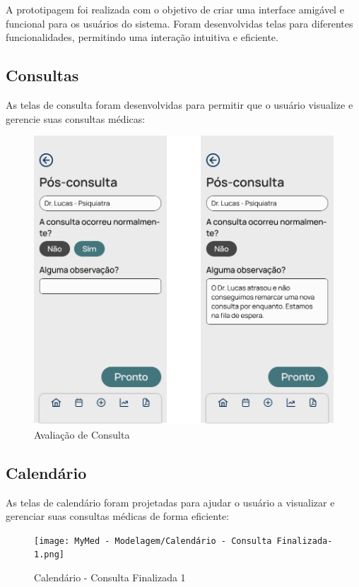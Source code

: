 \pagebreak

A prototipagem foi realizada com o objetivo de criar uma interface amigável e funcional para os usuários do sistema. Foram desenvolvidas telas para diferentes funcionalidades, permitindo uma interação intuitiva e eficiente.

\subsection{Consultas}

As telas de consulta foram desenvolvidas para permitir que o usuário visualize e gerencie suas consultas médicas:

\begin{figure}[!htbp]
	\centering
	\includegraphics[width=1.0\linewidth]{MyMed - Modelagem/Avaliação Consulta.png}
	\caption{Avaliação de Consulta}
	\label{avaliacao_consulta}
\end{figure}

\subsection{Calendário}

As telas de calendário foram projetadas para ajudar o usuário a visualizar e gerenciar suas consultas médicas de forma eficiente:

\begin{figure}[!htbp]
	\centering
	\texttt{[image: MyMed - Modelagem/Calendário - Consulta Finalizada-1.png]}
	\caption{Calendário - Consulta Finalizada 1}
	\label{calendario_consulta_finalizada_1}
\end{figure}

